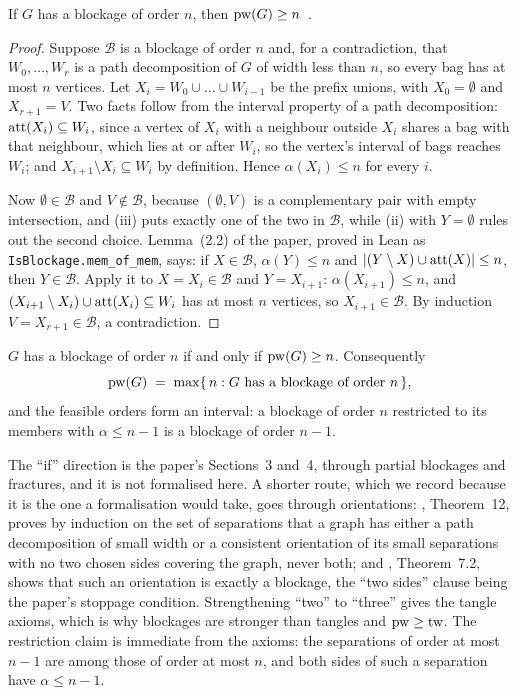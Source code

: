 \begin{theorem}\label{thm:blockage}
If $G$ has a blockage of order $n$, then $\mathrm{pw}(G)\ge n$~.
\end{theorem}
\begin{proof}
Suppose $\mathcal B$ is a blockage of order $n$ and, for a contradiction,
that $W_0,\dots,W_r$ is a path decomposition of $G$ of width less than $n$,
so every bag has at most $n$ vertices. Let $X_i=W_0\cup\dots\cup W_{i-1}$
be the prefix unions, with $X_0=\emptyset$ and $X_{r+1}=V$. Two facts follow
from the interval property of a path decomposition: $\operatorname{att}(X_i)\subseteq W_i$,
since a vertex of $X_i$ with a neighbour outside $X_i$ shares a bag with that
neighbour, which lies at or after $W_i$, so the vertex's interval of bags
reaches $W_i$; and $X_{i+1}\setminus X_i\subseteq W_i$ by definition. Hence
$\alpha(X_i)\le n$ for every $i$.

Now $\emptyset\in\mathcal B$ and $V\notin\mathcal B$, because $(\emptyset,V)$
is a complementary pair with empty intersection, and (iii) puts exactly one of
the two in $\mathcal B$, while (ii) with $Y=\emptyset$ rules out the second
choice. Lemma~(2.2) of the paper, proved in Lean as
\texttt{IsBlockage.mem\_of\_mem}, says: if $X\in\mathcal B$, $\alpha(Y)\le n$ and
$|(Y\setminus X)\cup\operatorname{att}(X)|\le n$, then $Y\in\mathcal B$. Apply it to
$X=X_i\in\mathcal B$ and $Y=X_{i+1}$: $\alpha(X_{i+1})\le n$, and
$(X_{i+1}\setminus X_i)\cup\operatorname{att}(X_i)\subseteq W_i$ has at most $n$
vertices, so $X_{i+1}\in\mathcal B$. By induction $V=X_{r+1}\in\mathcal B$, a
contradiction.
\end{proof}

\begin{theorem}\label{thm:blockage-strong}
$G$ has a blockage of order $n$ if and only if $\mathrm{pw}(G)\ge n$. Consequently
\[
\mathrm{pw}(G)\;=\;\max\{\,n : G \text{ has a blockage of order } n\,\},
\]
and the feasible orders form an interval: a blockage of order $n$ restricted
to its members with $\alpha\le n-1$ is a blockage of order $n-1$.
\end{theorem}

The ``if'' direction is the paper's Sections~3 and~4, through partial
blockages and fractures, and it is not formalised here. A shorter route,
which we record because it is the one a formalisation would take, goes
through orientations: \citet{Erde2017}, Theorem~12, proves by induction on
the set of separations that a graph has either a path decomposition of
small width or a consistent orientation of its small separations with no two
chosen sides covering the graph, never both; and \citet{DiestelOum2019},
Theorem~7.2, shows that such an orientation is exactly a blockage, the
``two sides'' clause being the paper's stoppage condition. Strengthening
``two'' to ``three'' gives the tangle axioms, which is why blockages are
stronger than tangles and $\mathrm{pw}\ge\mathrm{tw}$. The restriction claim is immediate
from the axioms: the separations of order at most $n-1$ are among those of
order at most $n$, and both sides of such a separation have $\alpha\le n-1$.

